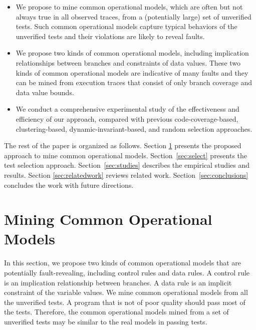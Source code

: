 \documentclass{sig-alternate}
\begin{document}
\begin{itemize}
\item \vspace{-0.1in}
We propose to mine common operational models, which are often but
not always true in all observed traces, from a (potentially large)
set of unverified tests. Such common operational models capture
typical behaviors of the unverified tests and their violations are
likely to reveal faults.


\item \vspace{-0.1in}
We propose two kinds of common operational models, including
implication relationships between branches and constraints of data
values. These two kinds of common operational models are indicative
of many faults and they can be mined from execution traces that
consist of only branch coverage and data value bounds.


\item \vspace{-0.1in}

We conduct a comprehensive experimental study of the effectiveness
and efficiency of our approach, compared with previous
code-coverage-based, clustering-based, dynamic-invariant-based, and
random selection approaches.


\end{itemize}

\vspace{-0.1in}

The rest of the paper is organized as follows. Section
\ref{sec:common} presents the proposed approach to mine common
operational models. Section~\ref{sec:select} presents the test
selection approach. Section~\ref{sec:studies} describes the
empirical studies and results. Section \ref{sec:relatedwork} reviews
related work. Section~\ref{sec:conclusions} concludes the work with
future directions.








\section{Mining Common Operational Models} \label{sec:common}

In this section, we propose two kinds of common operational models
that are potentially fault-revealing, including control rules and
data rules. A control rule is an implication relationship between
branches. A data rule is an implicit constraint of the variable
values. We mine common operational models from all the unverified
tests. A program that is not of poor quality should pass most of the
tests. Therefore, the common operational models mined from a set of
unverified tests may be similar to the real models in passing tests.
\end{document}
